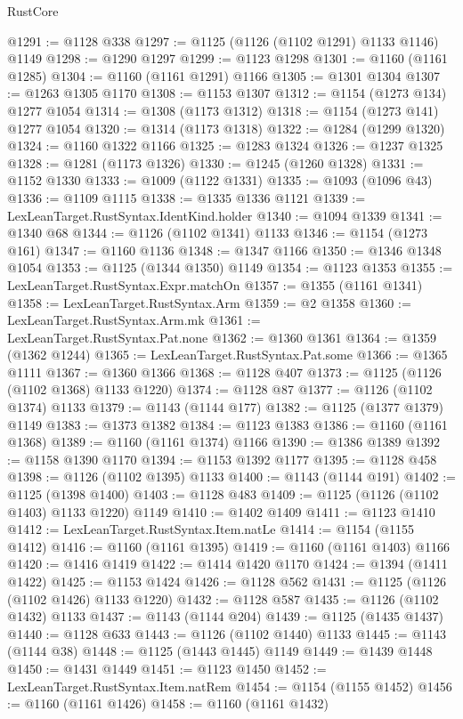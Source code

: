 \begin{lexlean}{RustCore}
\begin{coremodule}
@1291 := @1128 @338
@1297 := @1125 (@1126 (@1102 @1291) @1133 @1146) @1149
@1298 := @1290 @1297
@1299 := @1123 @1298
@1301 := @1160 (@1161 @1285)
@1304 := @1160 (@1161 @1291) @1166
@1305 := @1301 @1304
@1307 := @1263 @1305 @1170
@1308 := @1153 @1307
@1312 := @1154 (@1273 @134) @1277 @1054
@1314 := @1308 (@1173 @1312)
@1318 := @1154 (@1273 @141) @1277 @1054
@1320 := @1314 (@1173 @1318)
@1322 := @1284 (@1299 @1320)
@1324 := @1160 @1322 @1166
@1325 := @1283 @1324
@1326 := @1237 @1325
@1328 := @1281 (@1173 @1326)
@1330 := @1245 (@1260 @1328)
@1331 := @1152 @1330
@1333 := @1009 (@1122 @1331)
@1335 := @1093 (@1096 @43)
@1336 := @1109 @1115
@1338 := @1335 @1336 @1121
@1339 := LexLeanTarget.RustSyntax.IdentKind.holder
@1340 := @1094 @1339
@1341 := @1340 @68
@1344 := @1126 (@1102 @1341) @1133
@1346 := @1154 (@1273 @161)
@1347 := @1160 @1136
@1348 := @1347 @1166
@1350 := @1346 @1348 @1054
@1353 := @1125 (@1344 @1350) @1149
@1354 := @1123 @1353
@1355 := LexLeanTarget.RustSyntax.Expr.matchOn
@1357 := @1355 (@1161 @1341)
@1358 := LexLeanTarget.RustSyntax.Arm
@1359 := @2 @1358
@1360 := LexLeanTarget.RustSyntax.Arm.mk
@1361 := LexLeanTarget.RustSyntax.Pat.none
@1362 := @1360 @1361
@1364 := @1359 (@1362 @1244)
@1365 := LexLeanTarget.RustSyntax.Pat.some
@1366 := @1365 @1111
@1367 := @1360 @1366
@1368 := @1128 @407
@1373 := @1125 (@1126 (@1102 @1368) @1133 @1220)
@1374 := @1128 @87
@1377 := @1126 (@1102 @1374) @1133
@1379 := @1143 (@1144 @177)
@1382 := @1125 (@1377 @1379) @1149
@1383 := @1373 @1382
@1384 := @1123 @1383
@1386 := @1160 (@1161 @1368)
@1389 := @1160 (@1161 @1374) @1166
@1390 := @1386 @1389
@1392 := @1158 @1390 @1170
@1394 := @1153 @1392 @1177
@1395 := @1128 @458
@1398 := @1126 (@1102 @1395) @1133
@1400 := @1143 (@1144 @191)
@1402 := @1125 (@1398 @1400)
@1403 := @1128 @483
@1409 := @1125 (@1126 (@1102 @1403) @1133 @1220) @1149
@1410 := @1402 @1409
@1411 := @1123 @1410
@1412 := LexLeanTarget.RustSyntax.Item.natLe
@1414 := @1154 (@1155 @1412)
@1416 := @1160 (@1161 @1395)
@1419 := @1160 (@1161 @1403) @1166
@1420 := @1416 @1419
@1422 := @1414 @1420 @1170
@1424 := @1394 (@1411 @1422)
@1425 := @1153 @1424
@1426 := @1128 @562
@1431 := @1125 (@1126 (@1102 @1426) @1133 @1220)
@1432 := @1128 @587
@1435 := @1126 (@1102 @1432) @1133
@1437 := @1143 (@1144 @204)
@1439 := @1125 (@1435 @1437)
@1440 := @1128 @633
@1443 := @1126 (@1102 @1440) @1133
@1445 := @1143 (@1144 @38)
@1448 := @1125 (@1443 @1445) @1149
@1449 := @1439 @1448
@1450 := @1431 @1449
@1451 := @1123 @1450
@1452 := LexLeanTarget.RustSyntax.Item.natRem
@1454 := @1154 (@1155 @1452)
@1456 := @1160 (@1161 @1426)
@1458 := @1160 (@1161 @1432)

\end{coremodule}
\end{lexlean}
